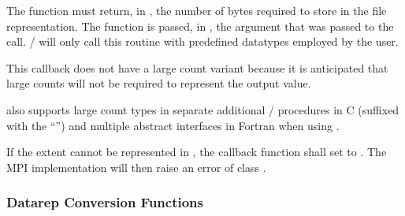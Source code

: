 The function 
must return, in , the number of bytes
required to store  in the file representation.
The function is passed, in ,
the argument that was passed to the  call.
\MPI/ will only call this routine with predefined datatypes
employed by the user.

\begin{rationale}
  This callback does not have a large count variant because it is
  anticipated that large counts will not be required to represent the
   output value.
\end{rationale}

also supports large count types in separate additional
\MPI/ procedures in C (suffixed with the ``'') and
multiple abstract interfaces in Fortran when using .

If the extent cannot be represented in , the callback
function shall set  to .  The
MPI implementation will then raise an error of class
.

\subsubsection{Datarep Conversion Functions}
\label{subsec:io:conversion-callback}

